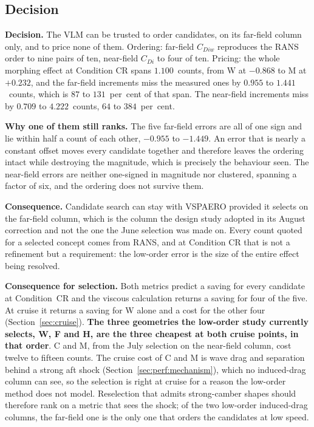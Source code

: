 \subsection{Decision}
\label{sec:qv:decision}
\textbf{Decision.} The VLM can be trusted to order candidates, on its far-field column only, and
to price none of them. Ordering: far-field $C_{Diw}$ reproduces the RANS order to nine pairs of
ten, near-field $C_{Di}$ to four of ten. Pricing: the whole morphing effect at Condition CR spans
$1.100$~counts, from W at $-0.868$ to M at $+0.232$, and the far-field increments miss the
measured ones by $0.955$ to $1.441$~counts, which is $87$ to $131$~per~cent of that span. The
near-field increments miss by $0.709$ to $4.222$~counts, $64$ to $384$~per~cent.

\textbf{Why one of them still ranks.} The five far-field errors are all of one sign and lie
within half a count of each other, $-0.955$ to $-1.449$. An error that is nearly a constant offset
moves every candidate together and therefore leaves the ordering intact while destroying the
magnitude, which is precisely the behaviour seen. The near-field errors are neither
one-signed in magnitude nor clustered, spanning a factor of six, and the ordering does not
survive them.

\textbf{Consequence.} Candidate search can stay with VSPAERO provided it selects on the
far-field column, which is the column the design study adopted in its August correction and not
the one the June selection was made on. Every count quoted for a selected concept comes from
RANS, and at Condition CR that is not a refinement but a requirement: the low-order error is the
size of the entire effect being resolved.

\textbf{Consequence for selection.} Both metrics predict a saving for every candidate at
Condition~CR and the viscous calculation returns a saving for four of the five. At cruise it
returns a saving for W alone and a cost for the other four (Section~\ref{sec:cruise}). \textbf{The
three geometries the low-order study currently selects, W, F and H, are the three cheapest at both
cruise points, in that order}. C and M, from the July selection on the near-field column, cost
twelve to fifteen counts.
The cruise cost of C and M is wave drag and separation behind a strong aft shock
(Section~\ref{sec:perf:mechanism}), which no induced-drag column can see, so the selection is
right at cruise for a reason the low-order method does not model. Reselection that admits
strong-camber shapes should therefore rank on a metric that sees the shock; of the two low-order
induced-drag columns, the far-field one is the only one that orders the candidates at low speed.
